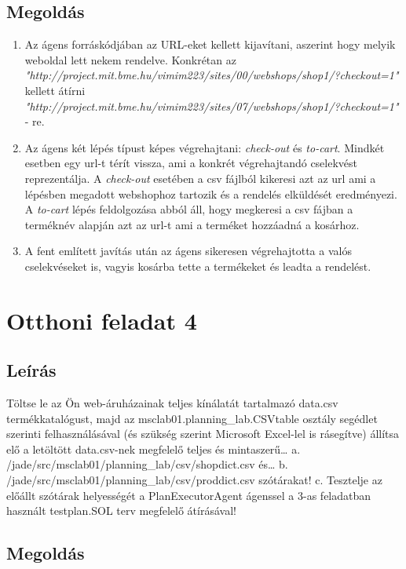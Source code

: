 \subsection{Megoldás}
\begin{enumerate}
\item Az ágens forráskódjában az URL-eket kellett kijavítani, aszerint hogy melyik weboldal lett nekem rendelve. Konkrétan az \emph{"http://project.mit.bme.hu/vimim223/sites/00/webshops/shop1/?checkout=1"} kellett átírni \emph{"http://project.mit.bme.hu/vimim223/sites/07/webshops/shop1/?checkout=1"} - re.
\item Az ágens két lépés típust képes végrehajtani: \emph{check-out} és \emph{to-cart}. Mindkét esetben egy url-t térít vissza, ami a konkrét végrehajtandó cselekvést reprezentálja. A \emph{check-out} esetében a csv fájlból kikeresi azt az url ami a lépésben megadott webshophoz tartozik és a rendelés elküldését eredményezi. A \emph{to-cart} lépés feldolgozása abból áll, hogy megkeresi a csv fájban a terméknév alapján azt az url-t ami a terméket hozzáadná a kosárhoz.
\item A fent említett javítás után az ágens sikeresen végrehajtotta a valós cselekvéseket is, vagyis kosárba tette a termékeket és leadta a rendelést.
\end{enumerate} 
\section{Otthoni feladat 4}
\subsection{Leírás}
Töltse le az Ön web-áruházainak teljes kínálatát tartalmazó data.csv termékkatalógust, majd az msclab01.planning\_lab.CSVtable osztály segédlet szerinti felhasználásával (és szükség szerint Microsoft Excel-lel is rásegítve) állítsa elő a letöltött data.csv-nek megfelelő teljes és mintaszerű… a. /jade/src/msclab01/planning\_lab/csv/shopdict.csv és… b. /jade/src/msclab01/planning\_lab/csv/proddict.csv szótárakat! c. Tesztelje az előállt szótárak helyességét a PlanExecutorAgent ágenssel a  3-as feladatban használt testplan.SOL terv megfelelő átírásával! 
\subsection{Megoldás}


